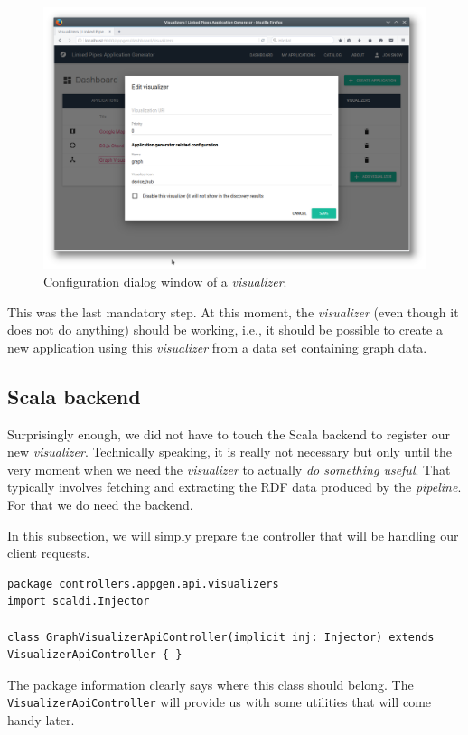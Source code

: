 \begin{figure}
	\centering
	\includegraphics[width=140mm]{img/05_edit_visualizer.png}
	\caption{Configuration dialog window of a \emph{visualizer}.} 
	\label{fig:edit-visualizer}
\end{figure}
This was the last mandatory step. At this moment, the \emph{visualizer} (even though it does not do anything) should be working, i.e., it should be possible to create a new application using this \emph{visualizer} from a data set containing graph data.

\subsection{Scala backend}

Surprisingly enough, we did not have to touch the Scala backend to register our new \emph{visualizer}. Technically speaking, it is really not necessary but only until the very moment when we need the \emph{visualizer} to actually \textit{do something useful}. That typically involves fetching and extracting the RDF data produced by the \emph{pipeline}. For that we do need the backend.

In this subsection, we will simply prepare the controller that will be handling our client requests.

\begin{verbatim}
package controllers.appgen.api.visualizers
import scaldi.Injector

class GraphVisualizerApiController(implicit inj: Injector) extends VisualizerApiController { }
\end{verbatim}

The package information clearly says where this class should belong. The \texttt{VisualizerApiController} will provide us with some utilities that will come handy later.

